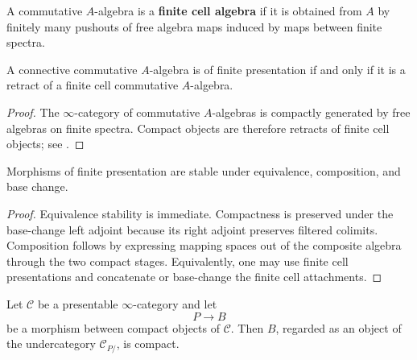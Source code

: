 \begin{definition}
\label{def:finite-cell-spectral-algebra}
A commutative $A$-algebra is a \textbf{finite cell algebra} if it is
obtained from $A$ by finitely many pushouts of free algebra maps induced by
maps between finite spectra.
\end{definition}

\begin{proposition}
\label{prop:finite-presentation-compactness-criterion}
A connective commutative $A$-algebra is of finite presentation if and only
if it is a retract of a finite cell commutative $A$-algebra.
\end{proposition}

\begin{proof}
The $\infty$-category of commutative $A$-algebras is compactly generated by
free algebras on finite spectra. Compact objects are therefore retracts of
finite cell objects; see \cite{LurieHigherAlgebra,LurieSAG}.
\end{proof}

\begin{proposition}
\label{prop:finite-presentation-permanence}
Morphisms of finite presentation are stable under equivalence,
composition, and base change.
\end{proposition}

\begin{proof}
Equivalence stability is immediate. Compactness is preserved under the
base-change left adjoint because its right adjoint preserves filtered
colimits. Composition follows by expressing mapping spaces out of the
composite algebra through the two compact stages. Equivalently, one may
use finite cell presentations and concatenate or base-change the finite
cell attachments.
\end{proof}

\begin{lemma}
\label{lem:compact-arrow-undercategory}
Let $\mathcal C$ be a presentable $\infty$-category and let
\[
    P
    \longrightarrow
    B
\]
be a morphism between compact objects of $\mathcal C$. Then $B$, regarded
as an object of the undercategory $\mathcal C_{P/}$, is compact.
\end{lemma}

